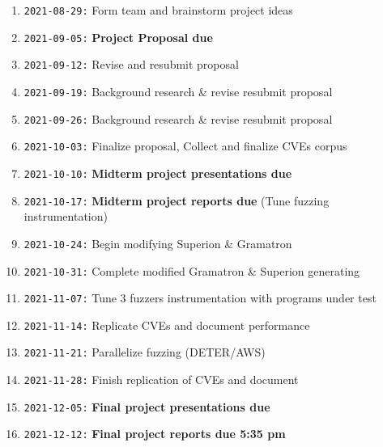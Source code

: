 \documentclass[12pt]{diazessay}
\begin{document}
\begin{enumerate}[label={}]
	\item \texttt{2021-08-29:} Form team and brainstorm project ideas
	\item \texttt{2021-09-05:} \textbf{Project Proposal due}
	\item \texttt{2021-09-12:} Revise and resubmit proposal
	\item \texttt{2021-09-19:} Background research \& revise \/ resubmit proposal
	\item \texttt{2021-09-26:} Background research \& revise \/ resubmit proposal
	\item \texttt{2021-10-03:} Finalize proposal, Collect and finalize CVEs corpus
	\item \texttt{2021-10-10:} \textbf{Midterm project presentations due}
	\item \texttt{2021-10-17:} \textbf{Midterm project reports due} \hfill (Tune fuzzing instrumentation)
	\item \texttt{2021-10-24:} Begin modifying Superion \& Gramatron
	\item \texttt{2021-10-31:} Complete modified Gramatron \& Superion generating
	\item \texttt{2021-11-07:} Tune 3 fuzzers instrumentation with programs under test
	\item \texttt{2021-11-14:} Replicate CVEs and document performance
	\item \texttt{2021-11-21:} Parallelize fuzzing \hfill (DETER/AWS)
	\item \texttt{2021-11-28:} Finish replication of CVEs and document
	\item \texttt{2021-12-05:} \textbf{Final project presentations due}
	\item \texttt{2021-12-12:} \textbf{Final project reports due 5:35 pm}
\end{enumerate}


\clearpage



\end{document}
